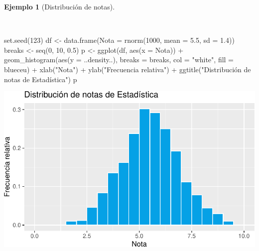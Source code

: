 \documentclass[
  a4paper,
]{scrreport}
\newenvironment{Shaded}{\begin{snugshade}}{\end{snugshade}}
\newcommand{\AttributeTok}[1]{\textcolor[rgb]{0.40,0.45,0.13}{#1}}
\newcommand{\DecValTok}[1]{\textcolor[rgb]{0.68,0.00,0.00}{#1}}
\newcommand{\FloatTok}[1]{\textcolor[rgb]{0.68,0.00,0.00}{#1}}
\newcommand{\FunctionTok}[1]{\textcolor[rgb]{0.28,0.35,0.67}{#1}}
\newcommand{\NormalTok}[1]{\textcolor[rgb]{0.00,0.23,0.31}{#1}}
\newcommand{\OtherTok}[1]{\textcolor[rgb]{0.00,0.23,0.31}{#1}}
\newcommand{\SpecialCharTok}[1]{\textcolor[rgb]{0.37,0.37,0.37}{#1}}
\newcommand{\StringTok}[1]{\textcolor[rgb]{0.13,0.47,0.30}{#1}}
\theoremstyle{plain}
\theoremstyle{definition}
\newtheorem{example}{Ejemplo}[chapter]
\theoremstyle{definition}
\theoremstyle{remark}
\begin{document}
\begin{example}[Distribución de
notas]\protect\hypertarget{exm-distribucion-notas}{}\label{exm-distribucion-notas}

~

\begin{Shaded}
\begin{Highlighting}[]
\FunctionTok{set.seed}\NormalTok{(}\DecValTok{123}\NormalTok{)}
\NormalTok{df }\OtherTok{\textless{}{-}} \FunctionTok{data.frame}\NormalTok{(}\AttributeTok{Nota =} \FunctionTok{rnorm}\NormalTok{(}\DecValTok{1000}\NormalTok{, }\AttributeTok{mean =} \FloatTok{5.5}\NormalTok{, }\AttributeTok{sd =} \FloatTok{1.4}\NormalTok{))}
\NormalTok{breaks }\OtherTok{\textless{}{-}} \FunctionTok{seq}\NormalTok{(}\DecValTok{0}\NormalTok{, }\DecValTok{10}\NormalTok{, }\FloatTok{0.5}\NormalTok{)}
\NormalTok{p }\OtherTok{\textless{}{-}} \FunctionTok{ggplot}\NormalTok{(df, }\FunctionTok{aes}\NormalTok{(}\AttributeTok{x =}\NormalTok{ Nota)) }\SpecialCharTok{+}
    \FunctionTok{geom\_histogram}\NormalTok{(}\FunctionTok{aes}\NormalTok{(}\AttributeTok{y =}\NormalTok{ ..density..), }\AttributeTok{breaks =}\NormalTok{ breaks, }\AttributeTok{col =} \StringTok{"white"}\NormalTok{, }\AttributeTok{fill =}\NormalTok{ blueceu) }\SpecialCharTok{+}
    \FunctionTok{xlab}\NormalTok{(}\StringTok{"Nota"}\NormalTok{) }\SpecialCharTok{+}
    \FunctionTok{ylab}\NormalTok{(}\StringTok{"Frecuencia relativa"}\NormalTok{) }\SpecialCharTok{+}
    \FunctionTok{ggtitle}\NormalTok{(}\StringTok{"Distribución de notas de Estadística"}\NormalTok{)}
\NormalTok{p}
\end{Highlighting}
\end{Shaded}

\includegraphics{02-estadistica-descriptiva_files/figure-pdf/histograma-notas-1.pdf}

\end{example}
\end{document}
